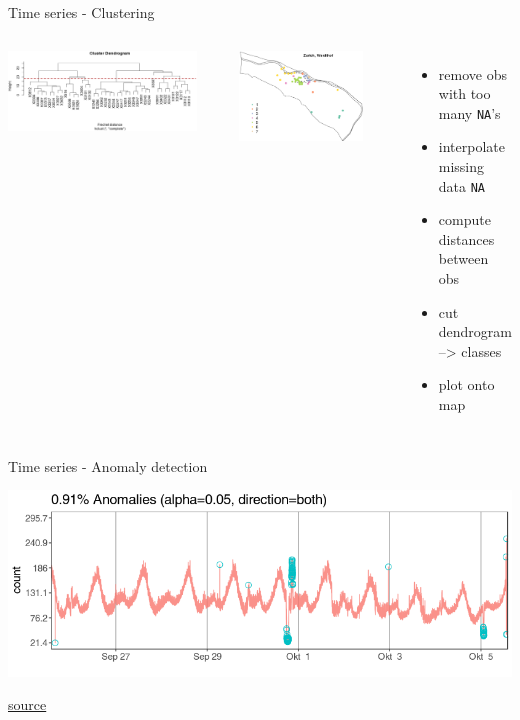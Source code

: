 \documentclass[8pt,ignorenonframetext,]{beamer}
\providecommand{\tightlist}{%
  \setlength{\itemsep}{0pt}\setlength{\parskip}{0pt}}
\newcommand{\columnsbegin}{\begin{columns}}
\newcommand{\columnsend}{\end{columns}}
\begin{document}
\begin{frame}[fragile]{Time series - Clustering}

\columnsbegin
{}

\includegraphics[width=0.90000\textwidth]{imgPres/ts_cluster_dendo.png}

\includegraphics[width=0.80000\textwidth]{imgPres/ts_cluster_map.png}

\begin{itemize}
\tightlist
\item
  remove obs with too many \texttt{NA}'s
\item
  interpolate missing data \texttt{NA}
\item
  compute distances between obs
\item
  cut dendrogram --\textgreater{} classes
\item
  plot onto map
\end{itemize}

\columnsend

\end{frame}

\begin{frame}{Time series - Anomaly detection}

\includegraphics{imgPres/TS_anomalydetection.png}

\href{https://github.com/twitter/AnomalyDetection}{source}

\end{frame}
\end{document}
